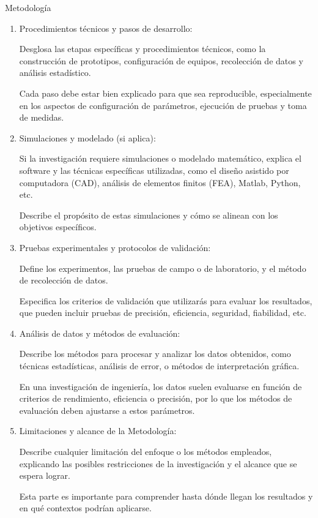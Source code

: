 \documentclass[9pt]{beamer}
\begin{document}
\begin{frame}{Metodología}
\begin{enumerate}
    \item Procedimientos técnicos y pasos de desarrollo:

    Desglosa las etapas específicas y procedimientos técnicos, como la construcción de prototipos, configuración de equipos, recolección de datos y análisis estadístico.

    Cada paso debe estar bien explicado para que sea reproducible, especialmente en los aspectos de configuración de parámetros, ejecución de pruebas y toma de medidas.

    \item Simulaciones y modelado (si aplica):

    Si la investigación requiere simulaciones o modelado matemático, explica el software y las técnicas específicas utilizadas, como el diseño asistido por computadora (CAD), análisis de elementos finitos (FEA), Matlab, Python, etc.

    Describe el propósito de estas simulaciones y cómo se alinean con los objetivos específicos.

    \item Pruebas experimentales y protocolos de validación:

    Define los experimentos, las pruebas de campo o de laboratorio, y el método de recolección de datos.

    Especifica los criterios de validación que utilizarás para evaluar los resultados, que pueden incluir pruebas de precisión, eficiencia, seguridad, fiabilidad, etc.

    \item Análisis de datos y métodos de evaluación:

    Describe los métodos para procesar y analizar los datos obtenidos, como técnicas estadísticas, análisis de error, o métodos de interpretación gráfica.

    En una investigación de ingeniería, los datos suelen evaluarse en función de criterios de rendimiento, eficiencia o precisión, por lo que los métodos de evaluación deben ajustarse a estos parámetros.

    \item Limitaciones y alcance de la Metodología:

    Describe cualquier limitación del enfoque o los métodos empleados, explicando las posibles restricciones de la investigación y el alcance que se espera lograr.

    Esta parte es importante para comprender hasta dónde llegan los resultados y en qué contextos podrían aplicarse.
\end{enumerate}


\end{frame}
\end{document}
